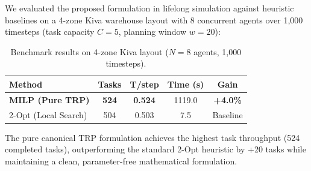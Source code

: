 \documentclass[10pt, twocolumn]{article}
\begin{document}
We evaluated the proposed formulation in lifelong simulation against heuristic baselines on a 4-zone Kiva warehouse layout with 8 concurrent agents over 1,000 timesteps (task capacity $C=5$, planning window $w=20$):

\begin{table}[h!]
\centering
\small
\setlength{\tabcolsep}{4pt}
\begin{tabular}{lcccc}
\toprule
\textbf{Method} & \textbf{Tasks} & \textbf{T/step} & \textbf{Time (s)} & \textbf{Gain} \\
\midrule
\textbf{MILP (Pure TRP)} & \textbf{524} & \textbf{0.524} & 1119.0 & \textbf{+4.0\%} \\
2-Opt (Local Search)     & 504          & 0.503          & 7.5    & Baseline \\
\bottomrule
\end{tabular}
\caption{Benchmark results on 4-zone Kiva layout ($N=8$ agents, 1,000 timesteps).}
\label{tab:results}
\end{table}

The pure canonical TRP formulation achieves the highest task throughput (524 completed tasks), outperforming the standard 2-Opt heuristic by +20 tasks while maintaining a clean, parameter-free mathematical formulation.
\end{document}
